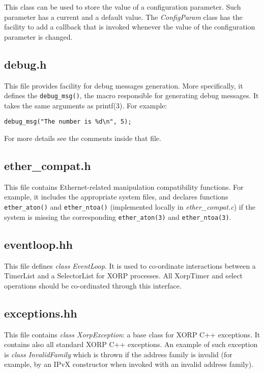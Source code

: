 \documentclass[11pt]{article}
\begin{document}
This class can be used to store the value of a configuration parameter.
Such parameter has a current and a default value.
The \emph{ConfigParam} class has the facility to add a callback that is
invoked whenever the value of the configuration parameter is changed.

\subsection{debug.h}

This file provides facility for debug messages generation.
More specifically, it defines the \verb=debug_msg()=, the macro
responsible for generating debug messages. 
It takes the same arguments as printf(3). For example:

\begin{verbatim}
debug_msg("The number is %d\n", 5);
\end{verbatim}

For more details see the comments inside that file.

\subsection{ether\_compat.h}

This file contains Ethernet-related manipulation compatibility
functions. For example, it includes the appropriate system files,
and declares functions \verb=ether_aton()= and \verb=ether_ntoa()=
(implemented locally in \emph{ether\_compat.c}) if the system is missing
the corresponding \verb=ether_aton(3)= and \verb=ether_ntoa(3)=.

\subsection{eventloop.hh}

This file defines \emph{class EventLoop}.
It is used to co-ordinate interactions between a TimerList and a
SelectorList for XORP processes.  All XorpTimer and select operations
should be co-ordinated through this interface.

\subsection{exceptions.hh}

This file contains \emph{class XorpException}: a base class for XORP C++
exceptions. It contains also all standard XORP C++ exceptions.
An example of such exception is \emph{class InvalidFamily} which is
thrown if the address family is invalid (for example, by an IPvX
constructor when invoked with an invalid address family).
\end{document}
